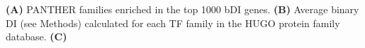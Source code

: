 \textbf{(A)} PANTHER families enriched in the top 1000 bDI genes.
\textbf{(B)} Average binary DI (see Methods) calculated for each TF family in the HUGO protein family database. 
\textbf{(C)} 

